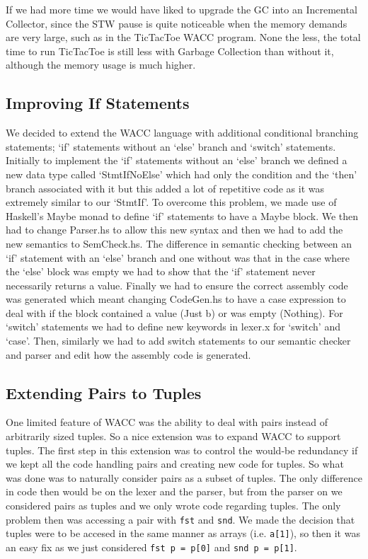 \documentclass{article}
\begin{document}
If we had more time we would have liked to upgrade the GC into an Incremental Collector, since the STW pause is quite noticeable when the memory demands are very large, such as in the TicTacToe WACC program. None the less, the total time to run TicTacToe is still less with Garbage Collection than without it, although the memory usage is much higher.



\subsection{Improving If Statements}
We decided to extend the WACC language with additional conditional branching statements; `if' statements without an `else' branch and `switch' statements. Initially to implement the `if' statements without an `else' branch we defined a new data type called `StmtIfNoElse' which had only the condition and the `then' branch associated with it but this added a lot of repetitive code as it was extremely similar to our `StmtIf'. To overcome this problem, we made use of Haskell's Maybe monad to  define `if' statements to have a Maybe block. We then had to change Parser.hs to allow this new syntax and then we had to add the new semantics to SemCheck.hs. The difference in semantic checking between an `if' statement with an `else' branch and one without was that in the case where the `else' block was empty we had to show that the `if' statement never necessarily returns a value.  Finally we had to ensure the correct assembly code was generated which meant changing CodeGen.hs to have a case expression to deal with if the block contained a value (Just b) or was empty (Nothing).
For `switch' statements we had to define new keywords in lexer.x for `switch' and `case'. Then, similarly we had to add switch statements to our semantic checker and parser and edit how the assembly code is generated.
\subsection{Extending Pairs to Tuples}
One limited feature of WACC was the ability to deal with pairs instead of arbitrarily sized tuples. So a nice extension was to expand WACC to support tuples. The first step in this extension was to control the would-be redundancy if we kept all the code handling pairs and creating new code for tuples. So what was done was to naturally consider pairs as a subset of tuples. The only difference in code then would be on the lexer and the parser, but from the parser on we considered pairs as tuples and we only wrote code regarding tuples. The only problem then was accessing a pair with \texttt{fst} and \texttt{snd}. We made the decision that tuples were to be accesed in the same manner as arrays (i.e. \texttt{a[1]}), so then it  was an easy fix as we just considered \texttt{fst p = p[0]} and \texttt{snd p = p[1]}.
\end{document}

